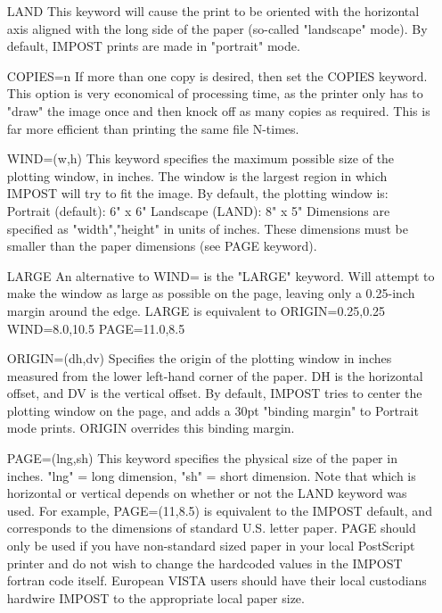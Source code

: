 \begin{itemize}
  \item[LAND]{This keyword will cause the print to be oriented with the
         horizontal axis aligned with the long side of the paper 
         (so-called "landscape" mode).  By default, IMPOST prints are 
         made in "portrait" mode.}
  \item[COPIES=n]{If more than one copy is desired, then set the COPIES keyword.
         This option is very economical of processing time, as the
         printer only has to "draw" the image once and then knock off
         as many copies as required.  This is far more efficient than 
         printing the same file N-times.}
  \item[WIND=(w,h)]{This keyword specifies the maximum possible size of the
         plotting window, in inches.  The window is the largest
         region in which IMPOST will try to fit the image.
         By default, the plotting window is:
             Portrait (default):  6" x 6"
               Landscape (LAND):  8" x 5"
         Dimensions are specified as "width","height" in units of inches.
         These dimensions must be smaller than the paper dimensions 
         (see PAGE keyword).}
  \item[LARGE]{An alternative to WIND= is the "LARGE" keyword.  Will attempt
         to make the window as large as possible on the page, leaving only
         a 0.25-inch margin around the edge.  LARGE is equivalent to
            ORIGIN=0.25,0.25  WIND=8.0,10.5  PAGE=11.0,8.5}
  \item[ORIGIN=(dh,dv)]{Specifies the origin of the plotting window
         in inches measured from the lower left-hand corner of the 
         paper.  DH is the horizontal offset, and DV is the vertical
         offset.  By default, IMPOST tries to center the plotting 
         window on the page, and adds a 30pt "binding margin" to 
         Portrait mode prints.  ORIGIN overrides this binding margin.}
  \item[PAGE=(lng,sh)]{This keyword specifies the physical size of the paper in
         inches.  "lng" = long dimension, "sh" = short dimension.
         Note that which is horizontal or vertical depends on
         whether or not the LAND keyword was used.  For example, 
         PAGE=(11,8.5) is equivalent to the IMPOST default, and
         corresponds to the dimensions of standard U.S. letter
         paper.  PAGE should only be used if you have non-standard 
         sized paper in your local PostScript printer and do not
         wish to change the hardcoded values in the IMPOST fortran
         code itself.  European VISTA users should have their
         local custodians hardwire IMPOST to the appropriate local
         paper size.}
\end{itemize}

